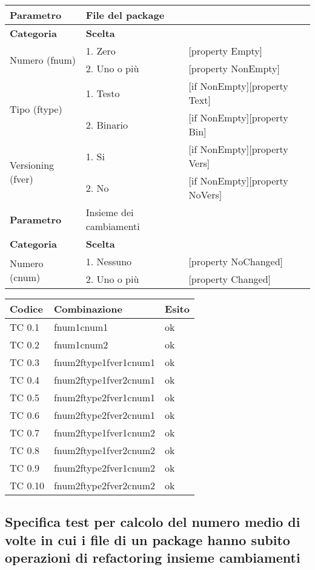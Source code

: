 			\begin{tabular}{|p{4cm}|p{4cm}p{5cm}|}
				\hline
				\cellcolor{Gray} \textbf{Parametro}		& File del package	&											\tabularnewline
				\hline
				\rowcolor{Gray}
				\textbf{Categoria} 						& \textbf{Scelta}			&									\tabularnewline
				\hline
				\multirow{2}{*}{Numero (fnum)} 			& 1. Zero 					&	[property Empty] 				\tabularnewline
				\cline{2-3}
														& 2. Uno o più				&	[property NonEmpty]				\tabularnewline
				\hline
				\multirow{2}{*}{Tipo (ftype)} 			& 1. Testo					&	[if NonEmpty][property Text] 	\tabularnewline
				\cline{2-3}
														& 2. Binario				&	[if NonEmpty][property Bin]		\tabularnewline
				\hline
				\multirow{2}{*}{Versioning (fver)}		& 1. Si						&	[if NonEmpty][property Vers]	\tabularnewline
				\cline{2-3}
														& 2. No						&	[if NonEmpty][property NoVers]	\tabularnewline
				\hline
				
				
				\cellcolor{Gray} \textbf{Parametro}		& Insieme dei cambiamenti	&									\tabularnewline
				\hline
				\rowcolor{Gray}
				\textbf{Categoria} 						& \textbf{Scelta}			&									\tabularnewline
				\hline
				\multirow{2}{*}{Numero (cnum)} 			& 1. Nessuno 				&	[property NoChanged]			\tabularnewline
				\cline{2-3}
														& 2. Uno o più				&	[property Changed]				\tabularnewline
				\hline		
				
			\end{tabular}

\vspace{1cm}

	\begin{tabular}{|p{3cm}|p{7cm}|p{3cm}|}
		\hline
		\rowcolor{Gray}
		\textbf{Codice} & \textbf{Combinazione} & \textbf{Esito}\tabularnewline
\hline
TC 0.1			& fnum1cnum1 			& ok \tabularnewline
\hline
TC 0.2 			& fnum1cnum2 			& ok \tabularnewline
\hline
TC 0.3 			& fnum2ftype1fver1cnum1 	& ok \tabularnewline
\hline
TC 0.4 			& fnum2ftype1fver2cnum1 	& ok \tabularnewline
\hline
TC 0.5 			& fnum2ftype2fver1cnum1 	& ok \tabularnewline
\hline
TC 0.6 			& fnum2ftype2fver2cnum1		& ok \tabularnewline
\hline
TC 0.7 			& fnum2ftype1fver1cnum2 	& ok \tabularnewline
\hline
TC 0.8			& fnum2ftype1fver2cnum2 	& ok \tabularnewline
\hline
TC 0.9			& fnum2ftype2fver1cnum2 	& ok \tabularnewline
\hline
TC 0.10 		& fnum2ftype2fver2cnum2 	& ok \tabularnewline
\hline
	\end{tabular}
\clearpage




\subsection{Specifica test per calcolo del numero medio di volte in cui i file di un package hanno subito operazioni di refactoring insieme cambiamenti}

